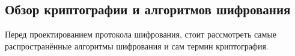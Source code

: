 \subsection{Обзор криптографии и алгоритмов шифрования}
\label{sec:analysis:research:crypto}

Перед проектированием протокола шифрования, стоит рассмотреть самые распространённые алгоритмы шифрования и сам термин криптография.



